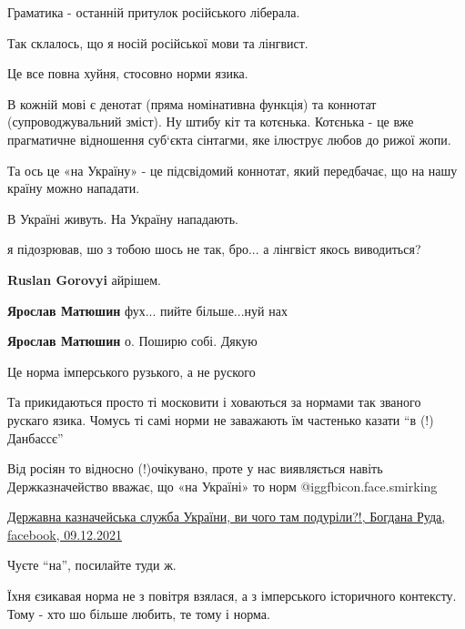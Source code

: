 \begin{itemize}
Граматика - останній притулок російського ліберала.


Так склалось, що я носій російської мови та лінгвист.

Це все повна хуйня, стосовно норми язика.

В кожній мові є денотат (пряма номінативна функція) та коннотат
(супроводжувальний зміст). Ну штибу кіт та котєнька. Котєнька - це вже
прагматичне відношення суб‘єкта сінтагми, яке ілюструє любов до рижої жопи.

Та ось це «на Україну» - це підсвідомий коннотат, який передбачає, що на нашу
країну можно нападати.

В Україні живуть. На Україну нападають.

\begin{itemize} %
я підозрював, шо з тобою шось не так, бро... а лінгвіст якось виводиться?

\textbf{Ruslan Gorovyi} айрішем.

\textbf{Ярослав Матюшин} фух... пийте більше...нуй нах

\textbf{Ярослав Матюшин} о. Поширю собі. Дякую
\end{itemize} %

Це норма імперського рузького, а не руского


Та прикидаються просто ті московити і ховаються за нормами так званого рускаго
язика. Чомусь ті самі норми не заважають їм частенько казати \enquote{в (!) Данбассє}


Від росіян то відносно (!)очікувано, проте у нас виявляється навіть
Держказначейство вважає, що «на Україні» то норм @igg{fbicon.face.smirking} 

\href{https://www.facebook.com/bogdana.ruda/posts/4653629018082354}{%
Державна казначейська служба України, ви чого там подуріли?!, Богдана Руда, facebook, 09.12.2021%
}

Чуєте \enquote{на}, посилайте туди ж.


Їхня єзикавая норма не з повітря взялася, а з імперського історичного
контексту. Тому - хто шо більше любить, те тому і норма.



\end{itemize}
